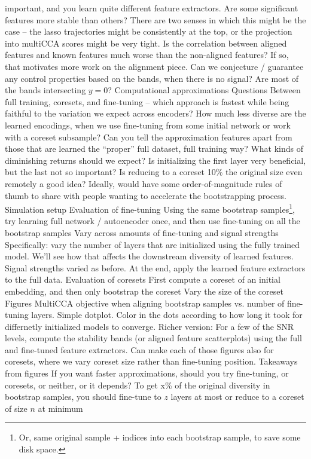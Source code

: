 \documentclass[11pt]{article}
\begin{document}
\begin{outline}
        important, and you learn quite different feature extractors.
        \4 Are some significant features more stable than others? There are two
        senses in which this might be the case -- the lasso trajectories might
        be consistently at the top, or the projection into multiCCA scores might
        be very tight.
        \4 Is the correlation between aligned features and known features much
        worse than the non-aligned features? If so, that motivates more work on
        the alignment piece.
        \4 Can we conjecture / guarantee any control properties based on the
        bands, when there is no signal? Are most of the bands intersecting $y =
        0$?
  \1 Computational approximations
    \2 Questions
      \3 Between full training, coresets, and fine-tuning -- which approach is
      fastest while being faithful to the variation we expect across encoders?
      \3 How much less diverse are the learned encodings, when we use
      fine-tuning from some initial network or work with a coreset subsample?
      \3 Can you tell the approximation features apart from those that are
      learned the ``proper'' full dataset, full training way?
      \3 What kinds of diminishing returns should we expect? Is initializing the
      first layer very beneficial, but the last not so important? Is reducing to
      a coreset 10\% the original size even remotely a good idea? Ideally, would
      have some order-of-magnitude rules of thumb to share with people wanting
      to accelerate the bootstrapping process.
    \2 Simulation setup
      \3 Evaluation of fine-tuning
        \4 Using the same bootstrap samples\footnote{Or, same original sample +
          indices into each bootstrap sample, to save some disk space.}, try
        learning full network / autoencoder once, and then use fine-tuning on
        all the bootstrap samples
        \4 Vary across amounts of fine-tuning and signal strengths
        \4 Specifically: vary the number of layers that are initialized using
        the fully trained model. We'll see how that affects the downstream
        diversity of learned features. Signal strengths varied as before.
        \4 At the end, apply the learned feature extractors to the full data.
      \3 Evaluation of coresets
        \4 First compute a coreset of an initial embedding, and then only
        bootstrap the coreset
        \4 Vary the size of the coreset
    \2 Figures
      \3 MultiCCA objective when aligning bootstrap samples vs. number of
      fine-tuning layers. Simple dotplot. Color in the dots according to how
      long it took for differnetly initialized models to converge.
      \3 Richer version: For a few of the SNR levels, compute the stability
      bands (or aligned feature scatterplots) using the full and fine-tuned
      feature extractors.
      \3 Can make each of those figures also for coresets, where we vary coreset
      size rather than fine-tuning position.
    \2 Takeaways from figures
      \3 If you want faster approximations, should you try fine-tuning, or
      coresets, or neither, or it depends?
      \3 To get x\% of the original diversity in bootstrap samples, you should
      fine-tune to $z$ layers at most or reduce to a coreset of size $n$ at
      minimum
\end{outline}
\end{document}
